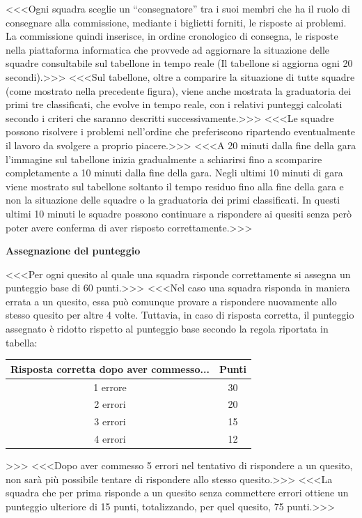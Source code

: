 \documentclass[12pt]{mcquiz}
\def\-#1{\qst <<<#1>>>}
\def\sec#1{\par{\bf\large#1}\par}
\begin{document}
\-{Ogni squadra sceglie un ``consegnatore'' tra i suoi membri che ha il ruolo di consegnare alla commissione, mediante i biglietti forniti, le risposte ai problemi. La commissione quindi inserisce, in ordine cronologico di consegna, le risposte nella piattaforma informatica che provvede ad aggiornare la situazione delle squadre consultabile sul tabellone in tempo reale (Il tabellone si aggiorna ogni 20 secondi).}
\-{Sul tabellone, oltre a comparire la situazione di tutte squadre (come mostrato nella precedente figura), viene anche mostrata la graduatoria dei primi tre classificati, che evolve in tempo reale, con i relativi punteggi calcolati secondo i criteri che saranno descritti successivamente.}
\-{Le squadre possono risolvere i problemi nell'ordine che preferiscono ripartendo eventualmente il lavoro da svolgere a proprio piacere.}
\-{A 20 minuti dalla fine della gara l'immagine sul tabellone inizia gradualmente a schiarirsi fino a scomparire completamente a 10 minuti dalla fine della gara. Negli ultimi 10 minuti di gara viene mostrato sul tabellone soltanto il tempo residuo fino alla fine della gara e non la situazione delle squadre o la graduatoria dei primi classificati. In questi ultimi 10 minuti le squadre possono continuare a rispondere ai quesiti senza però poter avere conferma di aver risposto correttamente.}
\sec{Assegnazione del punteggio}
\-{Per ogni quesito al quale una squadra risponde correttamente si assegna un punteggio base di 60 punti.}
\-{Nel caso una squadra risponda in maniera errata a un quesito, essa può comunque provare a rispondere nuovamente allo stesso quesito per altre 4 volte. Tuttavia, in caso di risposta corretta, il punteggio assegnato è ridotto rispetto al punteggio base secondo la regola riportata in tabella:
\begin{center}
\begin{tabular}{cc}
Risposta corretta dopo aver commesso... & \bf Punti\\ \hline
 1 errore & 30\\
 2 errori & 20\\
 3 errori & 15\\
 4 errori & 12\\
\end{tabular}
\end{center}}
\-{Dopo aver commesso 5 errori nel tentativo di rispondere a un quesito, non sarà più possibile tentare di rispondere allo stesso quesito.}
\-{La squadra che per prima risponde a un quesito senza commettere errori ottiene un punteggio ulteriore di 15 punti, totalizzando, per quel quesito, 75 punti.}
\end{document}
